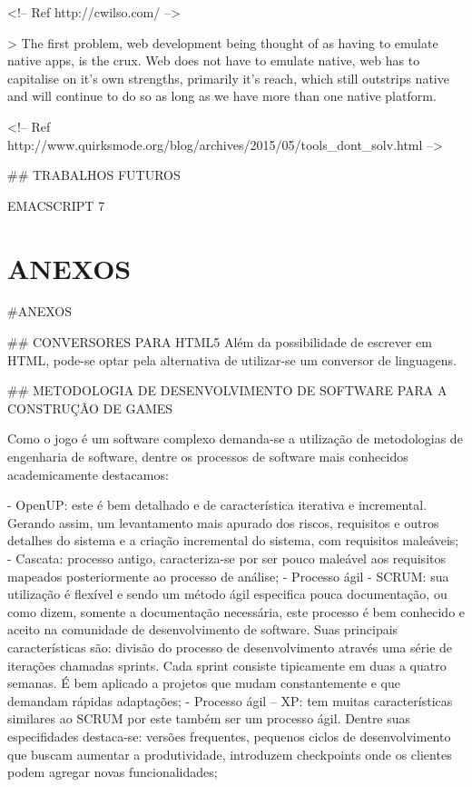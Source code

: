 \documentclass[11pt,a4paper]{article}
\begin{document}
<!-- Ref
http://cwilso.com/
-->

> The first problem, web development being thought of as having to emulate native apps, is the crux. Web does not have to emulate native, web has to capitalise on it's own strengths, primarily it's reach, which still outstrips native and will continue to do so as long as we have more than one native platform.


<!-- Ref
http://www.quirksmode.org/blog/archives/2015/05/tools_dont_solv.html
-->


## TRABALHOS FUTUROS

EMACSCRIPT 7


\chapter{ANEXOS}
#ANEXOS

## CONVERSORES PARA HTML5
Além da possibilidade de escrever em HTML, pode-se optar pela alternativa de utilizar-se um conversor de linguagens.

## METODOLOGIA DE DESENVOLVIMENTO DE SOFTWARE PARA A CONSTRUÇÃO DE GAMES

Como o jogo é um software complexo demanda-se a utilização de metodologias de engenharia de software, dentre os processos de software mais conhecidos academicamente destacamos:

- OpenUP: este é bem detalhado e de característica iterativa e incremental. Gerando assim, um levantamento mais apurado dos riscos, requisitos e outros detalhes do sistema e a criação incremental do sistema, com requisitos maleáveis;
- Cascata: processo antigo, caracteriza-se por ser pouco maleável aos requisitos mapeados posteriormente ao processo de análise;
- Processo ágil - SCRUM: sua utilização é flexível e sendo um método ágil especifica pouca documentação, ou como dizem, somente a documentação necessária, este processo é bem conhecido e aceito na comunidade de desenvolvimento de software. Suas principais características são: divisão do processo de desenvolvimento através uma série de iterações chamadas sprints. Cada sprint consiste tipicamente em duas a quatro semanas. É bem aplicado a projetos que mudam constantemente e que demandam rápidas adaptações;
- Processo ágil – XP: tem muitas características similares ao SCRUM por este também ser um processo ágil. Dentre suas especifidades destaca-se: versões frequentes, pequenos ciclos de desenvolvimento que buscam aumentar a produtividade, introduzem checkpoints onde os clientes podem agregar novas funcionalidades;
\end{document}
